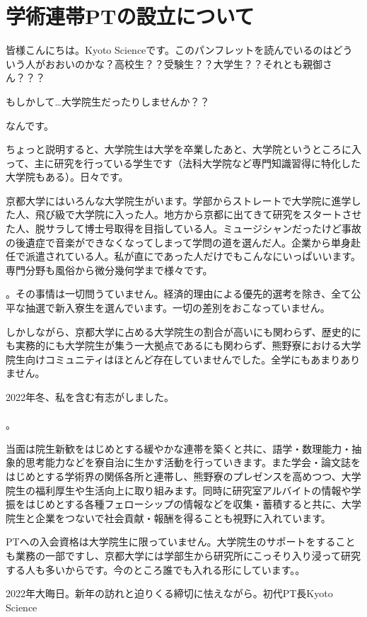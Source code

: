 \section{学術連帯PTの設立について}
\label{sec:gakujutu}

皆様こんにちは。Kyoto Scienceです。このパンフレットを読んでいるのはどういう人がおおいのかな？高校生？？受験生？？大学生？？それとも親御さん？？？

もしかして…大学院生だったりしませんか？？

なんです。

ちょっと説明すると、大学院生は大学を卒業したあと、大学院というところに入って、主に研究を行っている学生です（法科大学院など専門知識習得に特化した大学院もある）。日々です。

京都大学にはいろんな大学院生がいます。学部からストレートで大学院に進学した人、飛び級で大学院に入った人。地方から京都に出てきて研究をスタートさせた人、脱サラして博士号取得を目指している人。ミュージシャンだったけど事故の後遺症で音楽ができなくなってしまって学問の道を選んだ人。企業から単身赴任で派遣されている人。私が直にであった人だけでもこんなにいっぱいいます。専門分野も風俗から微分幾何学まで様々です。

。その事情は一切問うていません。経済的理由による優先的選考を除き、全て公平な抽選で新入寮生を選んでいます。一切の差別をおこなっていません。

しかしながら、京都大学に占める大学院生の割合が高いにも関わらず、歴史的にも実務的にも大学院生が集う一大拠点であるにも関わらず、熊野寮における大学院生向けコミュニティはほとんど存在していませんでした。全学にもあまりありません。

2022年冬、私を含む有志がしました。\\
\\
。

当面は院生新歓をはじめとする緩やかな連帯を築くと共に、語学・数理能力・抽象的思考能力などを寮自治に生かす活動を行っていきます。また学会・論文誌をはじめとする学術界の関係各所と連帯し、熊野寮のプレゼンスを高めつつ、大学院生の福利厚生や生活向上に取り組みます。同時に研究室アルバイトの情報や学振をはじめとする各種フェローシップの情報などを収集・蓄積すると共に、大学院生と企業をつないで社会貢献・報酬を得ることも視野に入れています。

PTへの入会資格は大学院生に限っていません。大学院生のサポートをすることも業務の一部ですし、京都大学には学部生から研究所にこっそり入り浸って研究する人も多いからです。今のところ誰でも入れる形にしています。。

\hfill 2022年大晦日。新年の訪れと迫りくる締切に怯えながら。\qquad 初代PT長Kyoto Science 
